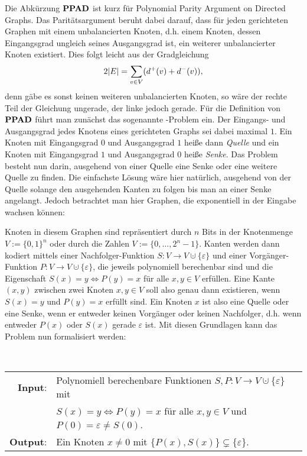Die Abkürzung $\textbf{PPAD}$ ist kurz für \glqq Polynomial Parity Argument on Directed Graphs\grqq.
Das Paritätsargument beruht dabei darauf, dass für jeden gerichteten Graphen mit einem unbalancierten Knoten, d.h. einem Knoten, dessen Eingangsgrad ungleich seines Ausgangsgrad ist, ein weiterer unbalancierter Knoten existiert.
Dies folgt leicht aus der Gradgleichung
\[
	2 \lvert E\rvert = \sum_{v\in V} ( d^+(v) + d^-(v) ),
\]
denn gäbe es sonst keinen weiteren unbalancierten Knoten, so wäre der rechte Teil der Gleichung ungerade, der linke jedoch gerade.
Für die Definition von~$\textbf{PPAD}$ führt man zunächst das sogenannte \EndOfTheLine-Problem ein.
Der Eingangs- und Ausgangsgrad jedes Knotens eines gerichteten Graphs sei dabei maximal $1$.
Ein Knoten mit Eingangsgrad $0$ und Ausgangsgrad $1$ heiße dann \emph{Quelle} und ein Knoten mit Eingangsgrad $1$ und Ausgangsgrad $0$ heiße \emph{Senke}.
Das Problem besteht nun darin, ausgehend von einer Quelle eine Senke oder eine weitere Quelle zu finden.
Die einfachste Lösung wäre hier natürlich, ausgehend von der Quelle solange den ausgehenden Kanten zu folgen bis man an einer Senke angelangt.
Jedoch betrachtet man hier Graphen, die exponentiell in der Eingabe wachsen können:

Knoten in diesem Graphen sind repräsentiert durch $n$ Bits in der Knotenmenge $V:=\{ 0,1 \}^n$ oder durch die Zahlen $V := \{ 0, \dots, 2^n -1 \}$.
Kanten werden dann kodiert mittels einer Nachfolger-Funktion $S: V\rightarrow V\cupdot \{ \varepsilon \}$ und einer Vorgänger-Funktion $P: V\rightarrow V \cupdot \{ \varepsilon \}$, die jeweils polynomiell berechenbar sind und die Eigenschaft $S(x) = y \Leftrightarrow P(y) = x$ für alle $x,y \in V$ erfüllen.
Eine Kante $(x,y)$ zwischen zwei Knoten $x,y \in V$ soll also genau dann existieren, wenn $S(x) = y$ und $P(y) = x$ erfüllt sind.
Ein Knoten $x$ ist also eine Quelle oder eine Senke, wenn er entweder keinen Vorgänger oder keinen Nachfolger, d.h. wenn entweder $P(x)$ oder $S(x)$ gerade $\varepsilon$ ist.
Mit diesen Grundlagen kann das Problem nun formalisiert werden:
\begin{center}
	\begin{mdframed}
		\centering
		\emph{\EndOfTheLine} \\[1em]
		\begin{tabular}{rl}
			{\bfseries Input}: &Polynomiell berechenbare Funktionen $S,P: V\rightarrow V\cupdot \{ \varepsilon \}$ mit\\
			& $S(x) = y \Leftrightarrow P(y) = x$ für alle $x,y \in V$ und
			$P(0) = \varepsilon \neq S(0)$. \\
			{\bfseries Output}: & Ein Knoten $x\neq 0$ mit $\{ P(x), S(x) \} \subsetneq \{ \varepsilon \}$.
		\end{tabular}
	\end{mdframed}
\end{center}

